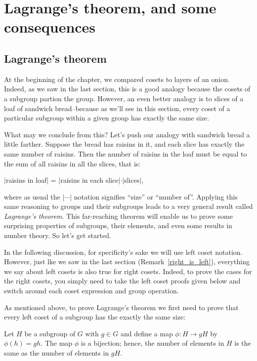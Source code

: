 \section{Lagrange's theorem, and some consequences}\label{sec:LagThm}

\subsection{Lagrange's theorem}
At the beginning of the chapter, we compared cosets to layers of an onion.  Indeed, as we saw in the last section, this is a good analogy because the cosets of a subgroup partion the group.  However, an even better analogy is to slices of a loaf of sandwich bread--because as we'll see in this section, every coset of a particular subgroup within a given group has exactly the same size. 

What may we conclude from this? Let's push our analogy with sandwich bread a little farther. Suppose the bread has raisins in it, and each slice has exactly the same number of raisins. Then the number of raisins in the loaf must be equal to the sum of all raisins in all the slices, that is:


$|$raisins in loaf$|$ = $|$raisins in each slice$| \cdot |$slices$|$,

\noindent
where as usual the $| \cdots |$ notation  signifies ``size'' or ``number of''.
Applying this same reasoning to groups and their subgroups leads to a very general result called \emph{Lagrange's theorem}.  This far-reaching theorem will enable us to prove some surprising  properties of subgroups, their elements, and even some results in number theory.  So let's get started.  

\begin{rem}\label{left_is_right}
In the following discussion, for specificity's sake we will use  left coset notation. However, just lke we saw in the last section (Remark~\ref{right_is_left}), everything we say about left cosets is also true for right cosets. Indeed, to prove the cases for the right cosets, you simply need to take the left coset proofs given below and switch around each coset expression and group operation.
\end{rem}

As mentioned above, to prove  Lagrange's theorem we first need to prove that every left coset of a subgroup has the exactly the same size:

\begin{thm}\label{cosets_theorem_4}
Let $H$ be a subgroup of $G$ with $g \in G$ and define a map $\phi:H \rightarrow gH$ by $\phi(h) = gh$.  The map $\phi$ is a bijection; hence, the number of elements in $H$ is the same as the number of elements in $gH$. 
\end{thm}
 
